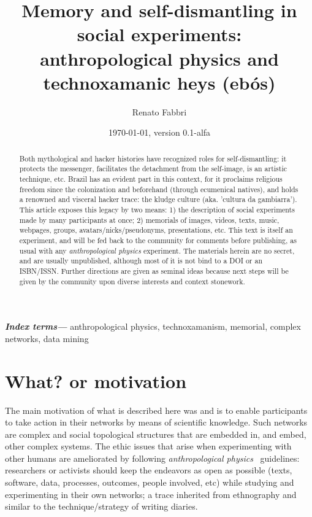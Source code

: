 \documentclass[a4paper]{article}
\title{
Memory and self-dismantling in social experiments:\\
anthropological physics and technoxamanic heys (ebós)
}
\author{Renato Fabbri}
\date{\today, version 0.1-alfa}
\providecommand{\keywords}[1]{\textbf{\textit{Index terms---}} #1}
\begin{document}
\maketitle



\begin{abstract}
Both mythological and hacker histories have recognized roles for
self-dismantling: it protects the messenger, facilitates the detachment
from the self-image, is an artistic technique, etc.  Brazil has an evident part
in this context, for it proclaims religious freedom since the colonization and
beforehand (through ecumenical natives), and holds a renowned and visceral hacker trace:
  the kludge culture (aka. 'cultura da gambiarra').  This article exposes this legacy by two
means: 1) the description of social experiments made by many participants at once;
2) memorials of images, videos, texts, music, webpages, groups,
avatars/nicks/pseudonyms, presentations, etc.  This text is itself an
experiment, and will be fed back to the community for comments before
publishing, as usual with any \emph{anthropological physics} experiment.  The
materials herein are no secret, and are usually unpublished, although most
of it is not bind to a DOI or an ISBN/ISSN.  Further directions are given as
seminal ideas because next steps will be given by the community upon diverse
interests and context stonework.
\end{abstract}

\keywords{
anthropological physics, technoxamanism, memorial, complex networks,
data mining
}

\tableofcontents

\section{What? or motivation}
The main motivation of what is described here was and is to enable
participants to take action in their networks by means of scientific
knowledge.  Such networks are complex and social topological
structures that are embedded in, and embed, other complex systems.  The ethic
issues that arise when experimenting with other humans are ameliorated by following
\emph{anthropological physics}~\cite{anPhy,anPhy2,thesis} guidelines:
researchers or activists should keep the endeavors as open as possible (texts,
software, data, processes, outcomes, people involved, etc) while studying and
experimenting in their own networks; a trace inherited from ethnography and
similar to the technique/strategy of writing diaries.
\end{document}
